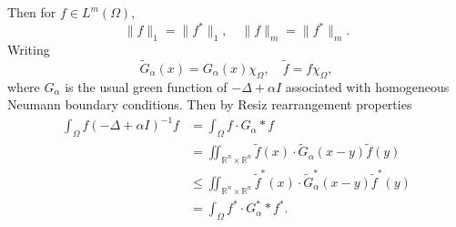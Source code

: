 Then for $f\in L^m(\Omega)$, 
\[
	\|f\|_1 = \|f^*\|_1, \quad \|f\|_m = \|f^*\|_m.
\]
Writing
\[
	\tilde G_\alpha(x) = G_\alpha(x)\chi_\Omega,\quad \tilde f = f\chi_\Omega, 
\]
where $G_\alpha$ is the usual green function of $-\Delta + \alpha I$ associated with homogeneous Neumann boundary conditions.
Then by Resiz rearrangement properties \cite[Lemma~2.1]{Lieb1983}
\begin{align*}
	\int_\Omega f(-\Delta + \alpha I)^{-1}f 
		&= \int_\Omega f \cdot G_\alpha * f\\
		&= \iint_{\mathbb{R}^n\times\mathbb{R}^n} \tilde{f}(x)\cdot\tilde{G}_\alpha(x-y)\tilde{f}(y)\\
		&\leq \iint_{\mathbb{R}^n\times\mathbb{R}^n} \tilde{f}^\ast(x)\cdot\tilde{G}^\ast_\alpha(x-y)\tilde{f}^\ast(y)\\
		&= \int_\Omega f^\ast\cdot G_\alpha^\ast*f^\ast.
\end{align*}

